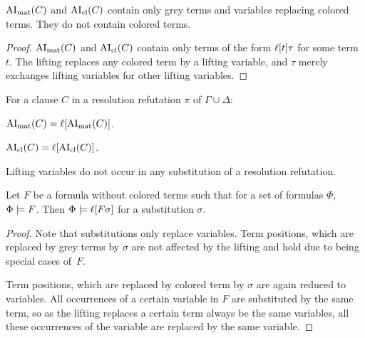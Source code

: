 \documentclass[,%
	paper=a4,%
	DIV12, %
	twoside=false,%
	liststotoc,
	bibtotoc,
	draft=false,%
	numbers=noendperiod
]{scrartcl}
\begin{document}
\begin{lemma}
	\label{lemma:no_colored_terms}
	$\operatorname{AI}_\mathrm{mat}(C)$ and $\operatorname{AI}_\mathrm{cl}(C)$ contain only grey terms and variables replacing colored terms. They do not contain colored terms.
\end{lemma}
\begin{proof}
	$\operatorname{AI}_\mathrm{mat}(C)$ and $\operatorname{AI}_\mathrm{cl}(C)$ contain only terms of the form $\ell[t]\tau$ for some term $t$.
	The lifting replaces any colored term by a lifting variable, and $\tau$ merely exchanges lifting variables for other lifting variables.
\end{proof}



\begin{corr}
	\label{corr:lift_ai}
	For a clause $C$ in a resolution refutation $\pi$ of $\Gamma \cup \Delta$:
	\begin{compactenum}
	\item $\operatorname{AI}_\mathrm{mat}(C) = \ell[\operatorname{AI}_\mathrm{mat}(C)]$.

	\item $\operatorname{AI}_\mathrm{cl}(C) = \ell[\operatorname{AI}_\mathrm{cl}(C)]$.
	\end{compactenum}
\end{corr}

\begin{lemma}
	\label{lemma:no_lifting_vars_in_subst}
	Lifting variables do not occur in any substitution of a resolution refutation.
\end{lemma}

\begin{lemma}
	\label{lemma:substitute_and_lift}
	Let $F$ be a formula without colored terms such that for a set of formulas $\Phi$, $\Phi \models F$.
	Then $\Phi \models \ell[F\sigma]$ for a substitution $\sigma$.
\end{lemma}
\begin{proof}
	Note that substitutions only replace variables. Term positions, which are replaced by grey terms by $\sigma$ are not affected by the lifting and hold due to being special cases of~$F$.

	Term positions, which are replaced by colored term by $\sigma$ are again reduced to variables.
	All occurrences of a certain variable in $F$ are substituted by the same term, so as the lifting replaces a certain term always be the same variables, all these occurrences of the variable are replaced by the same variable.
\end{proof}
\end{document}
